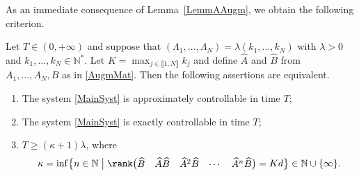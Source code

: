 As an immediate consequence of Lemma~\ref{LemmAAugm}, we obtain the following criterion.

\begin{prop}
\label{PropCommensurable}
Let $T \in (0, +\infty)$ and suppose that $(\Lambda_1, \dots, \Lambda_N) = \lambda (k_1, \dots, k_N)$ with $\lambda > 0$ and $k_1, \dots, k_N \in \mathbb N^\ast$. Let $K = \max_{j \in \llbracket 1, N\rrbracket} k_j$ and define $\widehat A$ and $\widehat B$ from $A_1, \dots, A_N, B$ as in \eqref{AugmMat}. Then the following assertions are equivalent.
\begin{enumerate}
\item\label{CtrlCommensurableApprox} The system \eqref{MainSyst} is approximately controllable in time $T$;
\item\label{CtrlCommensurableExact} The system \eqref{MainSyst} is exactly controllable in time $T$;
\item\label{CtrlCommensurableKalman} $T \geq (\kappa+1) \lambda$, where
\[
\kappa = \inf\bigl\{n \in \mathbb N \bigm| \rank\bigl(\begin{matrix}\widehat B & \widehat A \widehat B & \widehat A^2 \widehat B & \cdots & \widehat A^n \widehat B\end{matrix}\bigr) = K d\bigr\} \in \mathbb N \cup \{\infty\}.
\]
\end{enumerate}
\end{prop}

